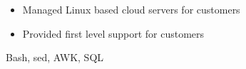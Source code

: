 \begin{experiences}
{\begin{itemize}
                        \item Managed Linux based cloud servers for customers
                        \item Provided first level support for customers
                      \end{itemize}
                    }
                    {Bash, sed, AWK, SQL}
\end{experiences}
